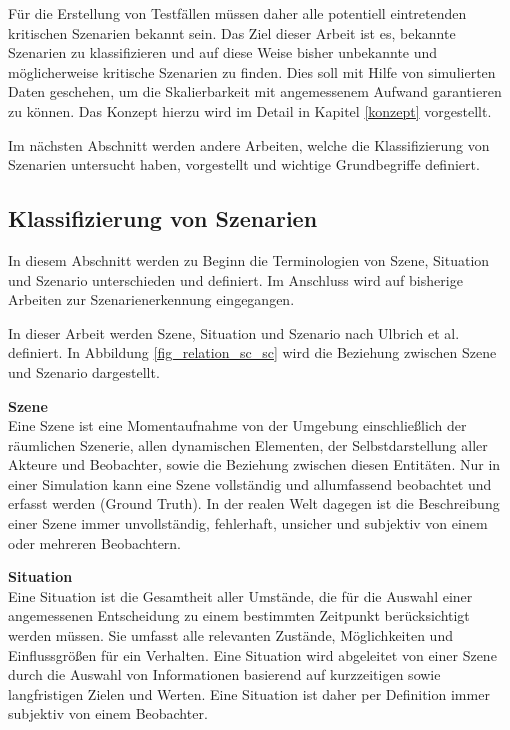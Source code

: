 Für die Erstellung von Testfällen müssen daher alle potentiell eintretenden kritischen Szenarien bekannt sein. Das Ziel dieser Arbeit ist es, bekannte Szenarien zu klassifizieren und auf diese Weise bisher unbekannte und möglicherweise kritische Szenarien zu finden. Dies soll mit Hilfe von simulierten Daten geschehen, um die Skalierbarkeit mit angemessenem Aufwand garantieren zu können. Das Konzept hierzu wird im Detail in Kapitel \ref{konzept} vorgestellt.

 Im nächsten Abschnitt werden andere Arbeiten, welche die Klassifizierung von Szenarien untersucht haben, vorgestellt und wichtige Grundbegriffe definiert.


\subsection{Klassifizierung von Szenarien}
\label{grundlagen_fahren_szenarien}

In diesem Abschnitt werden zu Beginn die Terminologien von Szene, Situation und Szenario unterschieden und definiert. Im Anschluss wird auf bisherige Arbeiten zur Szenarienerkennung eingegangen.

In dieser Arbeit werden Szene, Situation und Szenario nach Ulbrich et al. \cite{ulbrich2015defining} definiert. In Abbildung \ref{fig_relation_sc_sc} wird die Beziehung zwischen Szene und Szenario dargestellt.

\vspace{0,3cm}
\noindent\textbf{Szene}\\
Eine Szene ist eine Momentaufnahme von der Umgebung einschließlich der räumlichen Szenerie,  allen dynamischen Elementen, der Selbstdarstellung aller Akteure und Beobachter, sowie die Beziehung zwischen diesen Entitäten. Nur in einer Simulation kann eine Szene vollständig und allumfassend beobachtet und erfasst werden (Ground Truth). In der realen Welt dagegen ist die Beschreibung einer Szene immer unvollständig, fehlerhaft, unsicher und subjektiv von einem oder mehreren Beobachtern.

\vspace{0,3cm}
\noindent\textbf{Situation}\\
Eine Situation ist die Gesamtheit aller Umstände, die für die Auswahl einer angemessenen Entscheidung zu einem bestimmten Zeitpunkt berücksichtigt werden müssen. Sie umfasst alle relevanten Zustände, Möglichkeiten und Einflussgrößen für ein Verhalten. Eine Situation wird abgeleitet von einer Szene durch die Auswahl von Informationen basierend auf kurzzeitigen sowie langfristigen Zielen und Werten. Eine Situation ist daher per Definition immer subjektiv von einem Beobachter.

